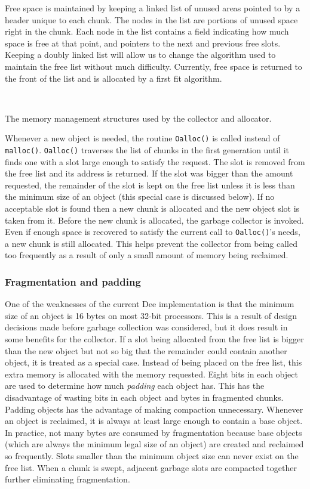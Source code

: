 Free space is maintained by keeping a linked list of unused areas
pointed to by a header unique to each chunk.  The nodes in the list
are portions of unused space right in the chunk.  Each node in the
list contains a field indicating how much space is free at that point,
and pointers to the next and previous free slots.  Keeping a doubly
linked list will allow us to change the algorithm used to maintain the
free list without much difficulty.  Currently, free space is returned
to the front of the list and is allocated by a first fit algorithm.

\begin{shortfigure}
\centerline{\hbox{
}}
\caption{The memory management structures used by the collector and allocator.}
\label{fig:chunks}
\end{shortfigure}

Whenever a new object is needed, the routine {\tt Oalloc()} is called
instead of {\tt malloc()}.  {\tt Oalloc()} traverses the list of
chunks in the first generation until it finds one with a slot large
enough to satisfy the request.  The slot is removed from the free list
and its address is returned.  If the slot was bigger than the amount
requested, the remainder of the slot is kept on the free list unless
it is less than the minimum size of an object (this special case is
discussed below).  If no acceptable slot is found then a new chunk is
allocated and the new object slot is taken from it.  Before the new
chunk is allocated, the garbage collector is invoked.  Even if enough
space is recovered to satisfy the current call to {\tt Oalloc()}'s
needs, a new chunk is still allocated.  This helps prevent the
collector from being called too frequently as a result of only a small
amount of memory being reclaimed.

\subsubsection{Fragmentation and padding}

One of the weaknesses of the current Dee implementation is that the
minimum size of an object is 16 bytes on most 32-bit processors.  This
is a result of design decisions made before garbage collection was
considered, but it does result in some benefits for the collector.  If
a slot being allocated from the free list is bigger than the new
object but not so big that the remainder could contain another object,
it is treated as a special case.  Instead of being placed on the free
list, this extra memory is allocated with the memory requested.  Eight
bits in each object are used to determine how much {\em padding} each
object has.  This has the disadvantage of wasting bits in each object
and bytes in fragmented chunks.  Padding objects has the advantage of
making compaction unnecessary.  Whenever an object is reclaimed, it is
always at least large enough to contain a base object.  In practice,
not many bytes are consumed by fragmentation because base objects
(which are always the minimum legal size of an object) are created and
reclaimed so frequently.  Slots smaller than the minimum object size
can never exist on the free list.  When a chunk is swept, adjacent
garbage slots are compacted together further eliminating
fragmentation.

